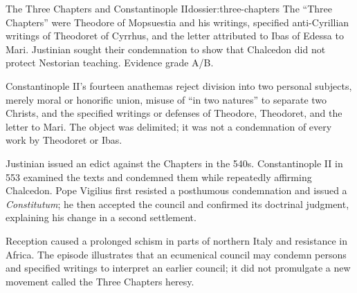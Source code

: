 \begin{heresydossier}{The Three Chapters and Constantinople II}{dossier:three-chapters}
\objectfield The ``Three Chapters'' were Theodore of Mopsuestia and his writings, specified anti-Cyrillian writings of Theodoret of Cyrrhus, and the letter attributed to Ibas of Edessa to Mari. Justinian sought their condemnation to show that Chalcedon did not protect Nestorian teaching. Evidence grade A/B.

\propositionfield Constantinople II's fourteen anathemas reject division into two personal subjects, merely moral or honorific union, misuse of ``in two natures'' to separate two Christs, and the specified writings or defenses of Theodore, Theodoret, and the letter to Mari. The object was delimited; it was not a condemnation of every work by Theodoret or Ibas.

\responsefield Justinian issued an edict against the Chapters in the 540s. Constantinople II in 553 examined the texts and condemned them while repeatedly affirming Chalcedon. Pope Vigilius first resisted a posthumous condemnation and issued a \emph{Constitutum}; he then accepted the council and confirmed its doctrinal judgment, explaining his change in a second settlement.

\aftermathfield Reception caused a prolonged schism in parts of northern Italy and resistance in Africa. The episode illustrates that an ecumenical council may condemn persons and specified writings to interpret an earlier council; it did not promulgate a new movement called the Three Chapters heresy.
\end{heresydossier}


